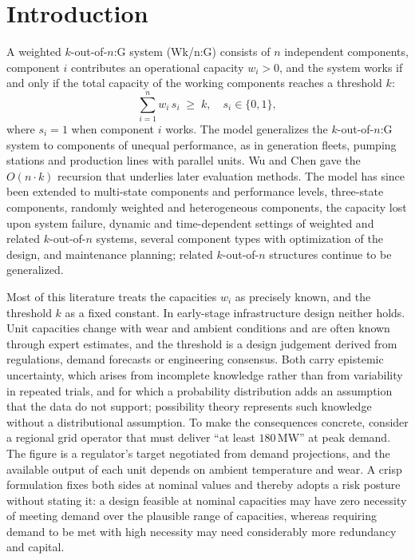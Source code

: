 \documentclass[Review,sagev,times]{sagej}%
\newcommand{\new}[1]{#1}
\begin{document}
\section{Introduction}

A weighted $k$-out-of-$n$:G system (Wk/n:G) consists of $n$ independent components, component $i$
contributes an operational capacity $w_i>0$, and the system works if and only if the total capacity of the
working components reaches a threshold $k$:
\begin{equation*}
  \sum_{i=1}^{n} w_i \, s_i \;\geq\; k, \quad s_i \in \{0, 1\},
\end{equation*}
where $s_i = 1$ when component $i$ works. The model generalizes the $k$-out-of-$n$:G system to components of
unequal performance, as in generation fleets, pumping stations and production lines with parallel units. Wu
and Chen\cite{WuChen1994} gave the $O(n\cdot k)$ recursion that underlies later evaluation methods\cite{Kuo2007}.
The model has since been extended to multi-state components and performance levels\cite{Zhuang2022,DingZuoLisnianski2010,Levitin2005},
three-state components\cite{Eryilmaz2019}, randomly weighted and heterogeneous
components\cite{ZHANG2021107184,EryilmazSarikaya2014}, the capacity lost upon system failure\cite{Eryilmaz2021},
dynamic and time-dependent settings of weighted and related $k$-out-of-$n$ systems\cite{EryilmazBozbulut2014,Xu2025}, several component types with optimization of the
design\cite{Ozkut2025}, and maintenance planning\cite{Sharifi2023corr,LorvandKelkinnama2023,Yang2022cbm,SinghSingh2025};
related $k$-out-of-$n$ structures continue to be generalized\cite{Gao2024sparse}.

Most of this literature treats the capacities $w_i$ as precisely known, and the threshold $k$ as a fixed
constant. In early-stage infrastructure design neither holds. Unit capacities change with wear and ambient
conditions and are often known through expert estimates, and the threshold is a design judgement derived from
regulations, demand forecasts or engineering consensus. Both carry epistemic uncertainty, which arises from
incomplete knowledge rather than from variability in repeated trials, and for which a probability distribution
adds an assumption that the data do not support\cite{Helton2004,Zio2009}; possibility theory represents such
knowledge without a distributional assumption\cite{InuiguchiRamik2000,DuboisPrade2012}. \new{To make the
consequences concrete, consider a regional grid operator that must deliver ``at least $180$\,MW'' at peak
demand. The figure is a regulator's target negotiated from demand projections, and the available output of
each unit depends on ambient temperature and wear.} A crisp formulation fixes both sides at nominal values and
thereby adopts a risk posture without stating it: a design feasible at nominal capacities may have zero
necessity of meeting demand over the plausible range of capacities, whereas requiring demand to be met with
high necessity may need considerably more redundancy and capital.
\end{document}
